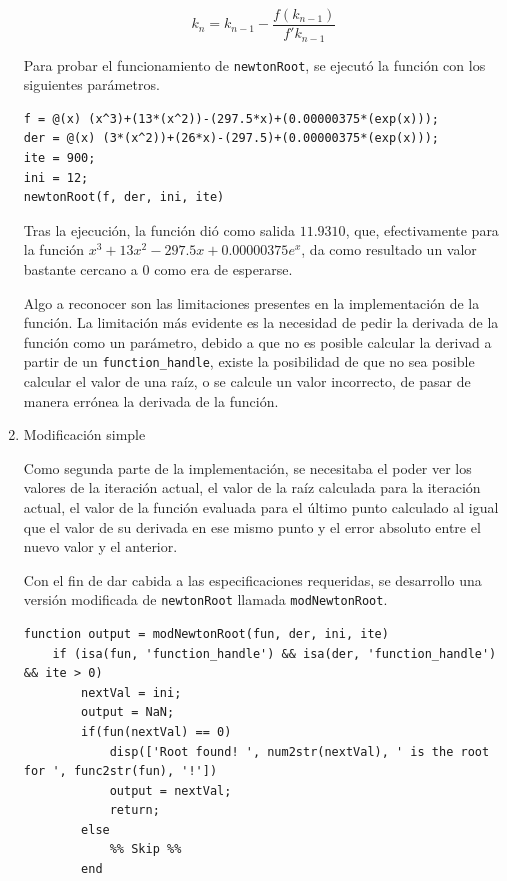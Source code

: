 \documentclass[english,notitlepage,letterpaper, 10pt]{article} %
\begin{document}
\begin{enumerate}
    \begin{equation}
        k_n = k_{n-1} - \frac{f(k_{n-1})}{f'{k_{n-1}}}        
    \end{equation}

    Para probar el funcionamiento de \texttt{newtonRoot}, se ejecutó la función con los siguientes parámetros.

    \begin{lstlisting}
f = @(x) (x^3)+(13*(x^2))-(297.5*x)+(0.00000375*(exp(x)));
der = @(x) (3*(x^2))+(26*x)-(297.5)+(0.00000375*(exp(x)));
ite = 900;
ini = 12;
newtonRoot(f, der, ini, ite)
    \end{lstlisting}

    Tras la ejecución, la función dió como salida $11.9310$, que, efectivamente para la función $x^3+13x^2-297.5x+0.00000375e^x$, da como resultado un valor bastante cercano a 0 como era de esperarse.

    Algo a reconocer son las limitaciones presentes en la implementación de la función. La limitación más evidente es la necesidad de pedir la derivada de la función como un parámetro, debido a que no es posible calcular la derivad a partir de un \texttt{function\_handle}, existe la posibilidad de que no sea posible calcular el valor de una raíz, o se calcule un valor incorrecto, de pasar de manera errónea la derivada de la función.

    \item Modificación simple
    
    Como segunda parte de la implementación, se necesitaba el poder ver los valores de la iteración actual, el valor de la raíz calculada para la iteración actual, el valor de la función evaluada para el último punto calculado al igual que el valor de su derivada en ese mismo punto y el error absoluto entre el nuevo valor y el anterior.

    Con el fin de dar cabida a las especificaciones requeridas, se desarrollo una versión modificada de \texttt{newtonRoot} llamada \texttt{modNewtonRoot}. 

\begin{lstlisting}
function output = modNewtonRoot(fun, der, ini, ite)
    if (isa(fun, 'function_handle') && isa(der, 'function_handle') && ite > 0)
        nextVal = ini;
        output = NaN;
        if(fun(nextVal) == 0) 
            disp(['Root found! ', num2str(nextVal), ' is the root for ', func2str(fun), '!'])
            output = nextVal;
            return;
        else
            %% Skip %%
        end
        

\end{lstlisting}
\end{enumerate}
\end{document}
